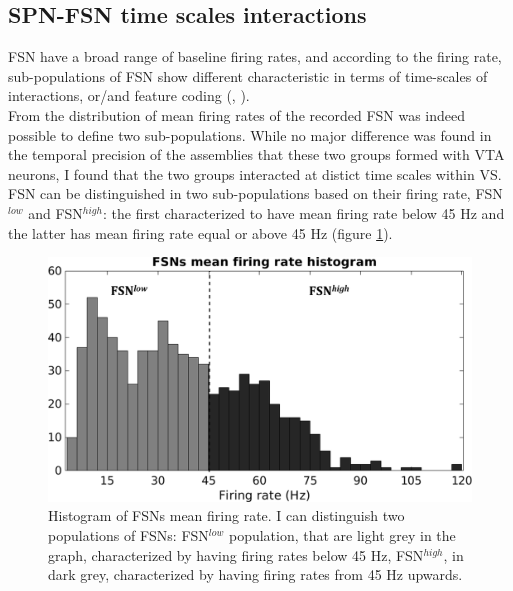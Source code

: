 \subsection{SPN-FSN time scales interactions}
\label{sec:SPN-FSN_Bin}
FSN have a broad range of baseline firing rates, and according to the firing rate, sub-populations of FSN show different characteristic in terms of time-scales of interactions, or/and feature coding (\cite{Heimer1997}, \cite{Tachibana2012}).\\From the distribution of mean firing rates of the recorded FSN was indeed possible to define two sub-populations. While no major difference was found in the temporal precision of the assemblies that these two groups formed with VTA neurons, I found that the two groups interacted at distict time scales within VS. FSN can be distinguished in two sub-populations based on their firing rate, FSN$^{low}$ and FSN$^{high}$: the first characterized to have mean firing rate below 45 Hz and the latter has mean firing rate equal or above 45 Hz (figure \ref{fig:FSNsFireHisto}).\\
\begin{figure}
    \centering
    \includegraphics[scale=0.65]{figures/FSNFiringRateLightDark.pdf}
    \caption{Histogram of FSNs mean firing rate. I can distinguish two populations of FSNs: FSN$^{low}$ population, that are light grey in the graph, characterized by having firing rates below 45 Hz, FSN$^{high}$, in dark grey, characterized by having firing rates from 45 Hz upwards.}
    \label{fig:FSNsFireHisto}
\end{figure}
